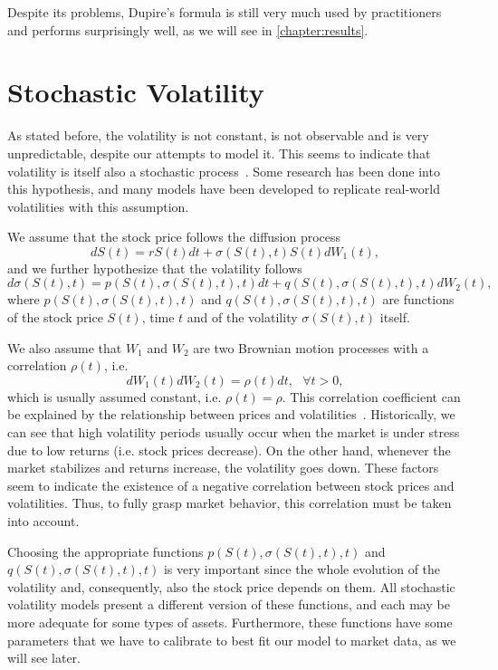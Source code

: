 Despite its problems, Dupire's formula is still very much used by practitioners and performs surprisingly well, as we will see in \autoref{chapter:results}.



\section{Stochastic Volatility}
\label{section:stochastic volatility}
As stated before, the volatility is not constant, is not observable and is very unpredictable, despite our attempts to model it. This seems to indicate that volatility is itself also a stochastic process~\citep{rebonato}. Some research has been done into this hypothesis, and many models have been developed to replicate real-world volatilities with this assumption.

We assume that the stock price follows the diffusion process
\begin{equation}\label{stochvol}
dS(t)=rS(t)dt+\sigma(S(t),t)S(t)dW_1(t),
\end{equation}
\noindent and we further hypothesize that the volatility follows
\begin{equation}
d\sigma(S(t),t)=p(S(t),\sigma(S(t),t),t)dt+q(S(t),\sigma(S(t),t),t)dW_2(t),
\end{equation}
\noindent where $p(S(t),\sigma(S(t),t),t)$ and $q(S(t),\sigma(S(t),t),t)$ are functions of the stock price $S(t)$, time $t$ and of the volatility $\sigma(S(t),t)$ itself.

We also assume that $W_1$ and $W_2$ are two Brownian motion processes with a correlation $\rho(t)$, i.e.
\begin{equation}
dW_1(t)dW_2(t)=\rho(t) dt, \ \ \ \forall t>0,
\end{equation}
\noindent which is usually assumed constant, i.e. $\rho(t)=\rho$. This correlation coefficient can be explained by the relationship between prices and volatilities~\citep{chourdakis}. Historically, we can see that high volatility periods usually occur when the market is under stress due to low returns (i.e. stock prices decrease).
On the other hand, whenever the market stabilizes and returns increase, the volatility goes down.
These factors seem to indicate the existence of a negative correlation between stock prices and volatilities. Thus, to fully grasp market behavior, this correlation must be taken into account.



Choosing the appropriate functions $p(S(t),\sigma(S(t),t),t)$ and $q(S(t),\sigma(S(t),t),t)$ is very important since the whole evolution of the volatility and, consequently, also the stock price depends on them. All stochastic volatility models present a different version of these functions, and each may be more adequate for some types of assets. Furthermore, these functions have some parameters that we have to calibrate to best fit our model to market data, as we will see later.


